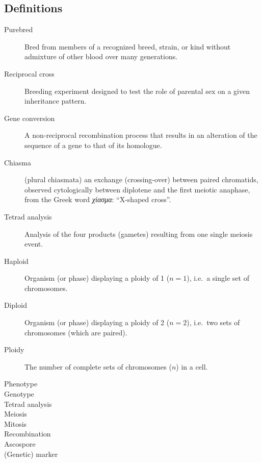 \begin{alwayssingle}\chapter*{Definitions}
	\thispagestyle{plain}
	\pagestyle{fancy}
	\fancyhead[RO,LE]{\emph{\thepage}}
	\setlength{\baselineskip}{\frontmatterbaselineskip}
	\begin{description}

		\item[Purebred] Bred from members of a recognized breed, strain, or kind without admixture of other blood over many generations.
		\item[Reciprocal cross] Breeding experiment designed to test the role of parental sex on a given inheritance pattern.
		\item[Gene conversion] A non-reciprocal recombination process that results in an alteration of the sequence of a gene to that of its homologue.
	\item[Chiasma] (plural chiasmata) an exchange (crossing-over) between paired chromatids, observed cytologically between diplotene and the first meiotic anaphase, from the Greek word \textit{\textgreek{χίασμα}}: “X-shaped cross”.%
		\item[Tetrad analysis] Analysis of the four products (gametes) resulting from one single meiosis event.
		\item[Haploid] Organism (or phase) displaying a ploidy of 1 ($n=1$), i.e.\ a single set of chromosomes.
		\item[Diploid] Organism (or phase) displaying a ploidy of 2 ($n=2$), i.e.\ two sets of chromosomes (which are paired).
		\item[Ploidy] The number of complete sets of chromosomes ($n$) in a cell. 
		\item[Phenotype]
		\item[Genotype]
		\item[Tetrad analysis]
		\item[Meiosis]
		\item[Mitosis]
		\item[Recombination]
		\item[Ascospore]
		\item[(Genetic) marker] %

\end{description}
\end{alwayssingle}
